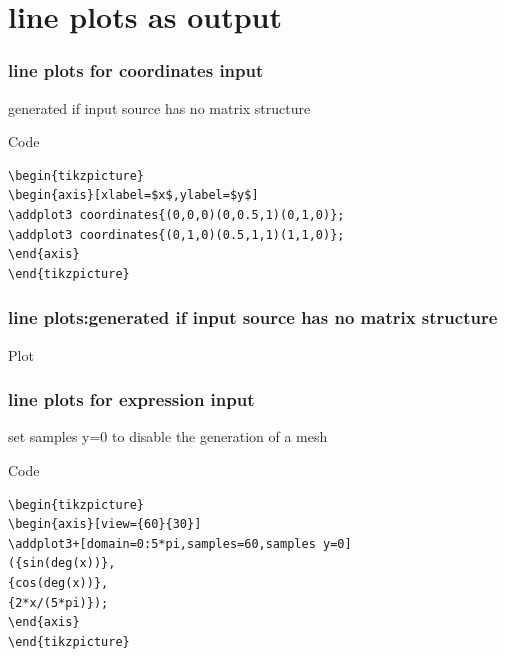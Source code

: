 \documentclass{beamer}
\begin{document}
\section{line plots as output}
\begin{frame}[fragile]
\frametitle{line plots for coordinates input}
generated if input source has no matrix structure\\
\vspace{30pt}
\small{
\begin{block}{Code}
\begin{verbatim}
\begin{tikzpicture}
\begin{axis}[xlabel=$x$,ylabel=$y$]
\addplot3 coordinates{(0,0,0)(0,0.5,1)(0,1,0)};
\addplot3 coordinates{(0,1,0)(0.5,1,1)(1,1,0)};
\end{axis}
\end{tikzpicture}
\end{verbatim}
\end{block}}
\end{frame}
\begin{frame}[fragile]
\frametitle{line plots:generated if input source has no matrix structure}
\begin{block}{Plot}
\end{block}
\end{frame}
\begin{frame}[fragile]
\frametitle{line plots for expression input}
set \color{blue} samples y=0 \color{black} to disable the generation of a mesh\\
\vspace{30pt}
\small{
\begin{block}{Code}
\begin{verbatim}
\begin{tikzpicture}
\begin{axis}[view={60}{30}]
\addplot3+[domain=0:5*pi,samples=60,samples y=0]
({sin(deg(x))},
{cos(deg(x))},
{2*x/(5*pi)});
\end{axis}
\end{tikzpicture}
\end{verbatim}
\end{block}}
\end{frame}
\end{document}
